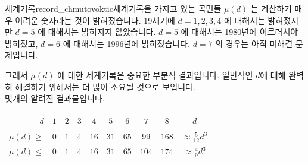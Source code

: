 \begin{surferIntroPage}{세계기록}{record_chmutovoktic}{세계기록을 가지고 있는 곡면들}
$\mu(d)$ 는 계산하기 매우 어려운 숫자라는 것이 밝혀졌습니다. $19$세기에 $d=1,2,3,4$ 에 대해서는 밝혀졌지만 $d=5$ 에 대해서는 밝혀지지 않았습니다. $d=5$ 에 대해서는 1980년에 이르러서야 밝혀졌고, $d=6$ 에 대해서는 1996년에 밝혀졌습니다. $d=7$ 의 경우는 아직 미해결 문제입니다. 
  
그래서 $\mu(d)$ 에 대한 세계기록은 중요한 부분적 결과입니다. 일반적인 $d$에 대해 완벽히 해결하기 위해서는 더 많이 소요될 것으로 보입니다. \\  몇개의 알려진 결과물입니다.  
    
   \begin{center}
      \begin{tabular}{r|cccccccc|c}
        $d$ & $1$ & $2$ & $3$ & $4$ & $5$ & $6$ & $7$ & $8$ & $d$\\
        \hline
        \hline
        \rule{0pt}{1.2em}$\mu(d)\ge$ & $0$ & $1$ & $4$ & $16$ & $31$ & $65$ &
        $99$ & $168$ & 
        $\approx \frac{5}{12}d^3$\\[0.3em]
        \hline
        \rule{0pt}{1.2em}$\mu(d)\le$ & $0$ & $1$ & $4$ & $16$ & $31$ & $65$ &
        $104$ & $174$ & $\approx \frac{4}{9}d^3$
      \end{tabular}
    \end{center}
\end{surferIntroPage}
